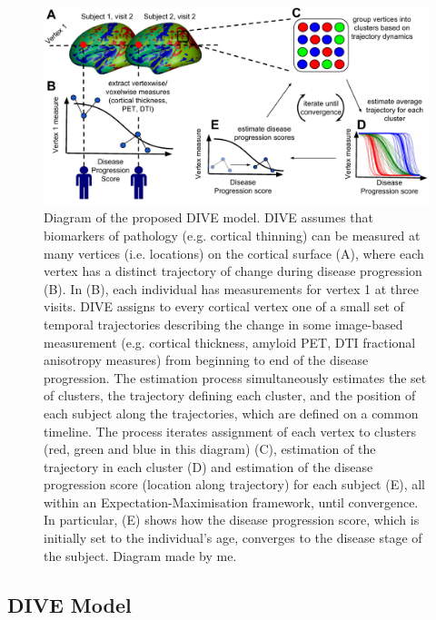 \begin{figure}
 \centering
 \includegraphics[width=\textwidth]{images/vwdpm_diagram.pdf}
 \caption[Diagram of the proposed DIVE model.]{Diagram of the proposed DIVE model. DIVE assumes that biomarkers of pathology (e.g. cortical thinning) can be measured at many vertices (i.e. locations) on the cortical surface (A), where each vertex has a distinct trajectory of change during disease progression (B). In (B), each individual has measurements for vertex 1 at three visits. DIVE assigns to every cortical vertex one of a small set of temporal trajectories describing the change in some image-based measurement (e.g. cortical thickness, amyloid PET, DTI fractional anisotropy measures) from beginning to end of the disease progression. The estimation process simultaneously estimates the set of clusters, the trajectory defining each cluster, and the position of each subject along the trajectories, which are defined on a common timeline. The process iterates assignment of each vertex to clusters (red, green and blue in this diagram) (C), estimation of the trajectory in each cluster (D) and estimation of the disease progression score (location along trajectory) for  each subject (E), all within an Expectation-Maximisation framework, until convergence. In particular, (E) shows how the disease progression score, which is initially set to the individual's age, converges to the disease stage of the subject. Diagram made by me. }
 \label{fig:diveDiagram}
\end{figure}

\subsection{DIVE Model}
\label{sec:diveMod}

